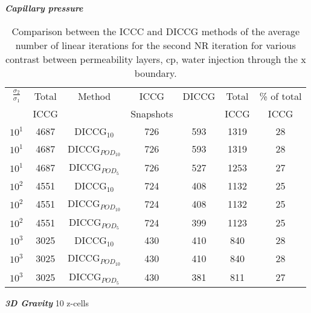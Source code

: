 \documentclass[a4paper,10pt]{report}
\begin{document}
\emph{\textbf{Capillary pressure}}
\begin{table}[!ht]\centering
\begin{minipage}{1\textwidth}
 \centering
\begin{tabular}{ ||c|c||c|c|c|c|c||} 
\hline
$\frac{\sigma_2}{\sigma_1}$&Total&Method  & ICCG&DICCG &Total&\% of total\\ 
                           & ICCG     &  & Snapshots& &ICCG& ICCG\\ 
\hline 
$10^{1}$ &4687& DICCG$_{10}$&726&593&1319&28\\ 
\hline  
$10^{1}$ &4687& DICCG$_{POD_{10}}$&726&593&1319&28 \\ 
\hline  
$10^{1}$ &4687& DICCG$_{POD_{5}}$&726&527&1253&27 \\ 
\hline  
$10^{2}$ &4551& DICCG$_{10}$&724&408&1132&25\\ 
\hline  
$10^{2}$ &4551& DICCG$_{POD_{10}}$&724&408&1132&25 \\ 
\hline  
$10^{2}$ &4551& DICCG$_{POD_{5}}$&724&399&1123&25 \\ 
\hline 
$10^{3}$ &3025& DICCG$_{10}$&430&410&840&28\\ 
\hline  
$10^{3}$ &3025& DICCG$_{POD_{10}}$&430&410&840&28 \\ 
\hline  
$10^{3}$ &3025& DICCG$_{POD_{5}}$&430&381&811&27 \\ 
\hline  
\end{tabular} 
\caption{Comparison between the ICCC and DICCG methods of the average number of linear iterations for the second NR iteration for various contrast between permeability layers, cp, water injection through the x boundary. }\label{table:litertot2} 
\end{minipage}  
\end{table} 
\newpage
\emph{\textbf{3D Gravity}}
10 z-cells
\end{document}
